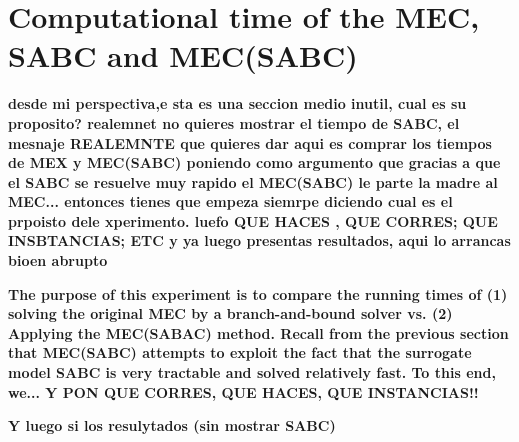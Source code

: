 \section{Computational time of the MEC, SABC and MEC(SABC)} \label{runtime}

\textbf{desde mi perspectiva,e sta es una seccion medio inutil, cual es su proposito? realemnet no quieres mostrar el tiempo de SABC, el mesnaje REALEMNTE que quieres dar aqui es comprar los tiempos de MEX y MEC(SABC) poniendo como argumento que gracias a que el SABC se resuelve muy rapido el MEC(SABC) le parte la madre al MEC... entonces tienes que empeza siemrpe diciendo cual es el prpoisto dele xperimento. luefo QUE HACES , QUE CORRES; QUE INSBTANCIAS; ETC y ya luego presentas resultados, aqui lo arrancas bioen abrupto}

\textbf{The purpose of this experiment is to compare the running times of (1) solving the original MEC by a branch-and-bound solver vs. (2) Applying the MEC(SABAC) method.  Recall from the previous section that MEC(SABC) attempts to exploit the fact that the surrogate model SABC is very tractable and solved relatively fast.  To this end, we... Y PON QUE CORRES, QUE HACES, QUE INSTANCIAS!!}

\textbf{Y luego si los resulytados (sin mostrar SABC)}

